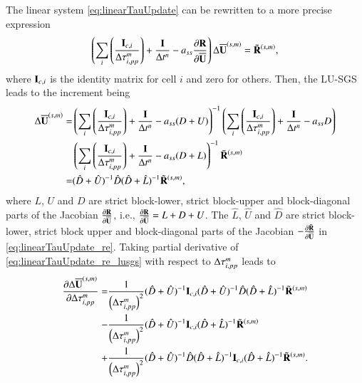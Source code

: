 The linear system \eqref{eq:linearTauUpdate} can be rewritten to a more precise expression
\begin{equation}
    \left(\sum_i\left(\frac{\eye_{c,i}}{\inc \tau^m_{i,pp}}\right) + \frac{\eye}{\inc t^n} -a_{ss}\partialderivative{\R }{\uu} \right) \inc \uu^{\left(s,m\right)}
    = \tilde{\R}^{\left(s,m\right)},
    \label{eq:linearTauUpdate_re}
\end{equation}
where $\mathbf{I}_{c,i}$ is 
the identity matrix for cell $i$ and zero for others.
Then, the LU-SGS leads to the increment being
\begin{equation}
    \begin{aligned}
        \mathrm\Delta \overline{\mathbf{U}}^{\left(s,m\right)}
     = &
    \left(\sum_i\left(\frac{\mathbf{I}_{c,i}}{\mathrm\Delta \tau^m_{i,pp}}\right) + \frac{\mathbf{I}}{\mathrm\Delta t^n} -a_{ss}(D+U) \right)^{-1}
    \left(\sum_i\left(\frac{\mathbf{I}_{c,i}}{\mathrm\Delta \tau^m_{i,pp}}\right) + \frac{\mathbf{I}}{\mathrm\Delta t^n} -a_{ss}D \right)\\
    &
    \left(\sum_i\left(\frac{\mathbf{I}_{c,i}}{\mathrm\Delta \tau^m_{i,pp}}\right) + \frac{\mathbf{I}}{\mathrm\Delta t^n} -a_{ss}(D+L) \right)^{-1}
    \tilde{\mathbf{R}}^{\left(s,m\right)} \\
    = & (\hat{D}+\hat{U})^{-1}\hat{D}(\hat{D}+\hat{L})^{-1}
    \tilde{\mathbf{R}}^{\left(s,m\right)} , 
    \end{aligned}
    \label{eq:linearTauUpdate_re_lusgs}
\end{equation}
where $L$, $U$ and $D$ are strict block-lower, strict block-upper and block-diagonal 
parts of the Jacobian $\partialderivative{\R }{\uu}$, i.e., $\partialderivative{\R }{\uu} = L + D + U$.
The $\hat L$, $\hat U$ and $\hat D$ are strict block-lower, strict block upper and block-diagonal 
parts of the Jacobian $-\partialderivative{\tilde\R }{\uu}$ in \eqref{eq:linearTauUpdate_re}.
Taking partial derivative of \eqref{eq:linearTauUpdate_re_lusgs} with respect to $\mathrm\Delta\tau^m_{i,pp}$ leads to
\begin{equation}
    \begin{aligned}
       \pdv{\mathrm\Delta\overline{\mathbf{U}}^{\left(s,m\right)}}{\mathrm\Delta\tau^m_{i,pp}}
    = & \frac{1}{\left(\mathrm\Delta\tau^m_{i,pp}\right)^2}
    (\hat{D}+\hat{U})^{-1}\mathbf{I}_{c,i}(\hat{D}+\hat{U})^{-1}\hat{D}(\hat{D}+\hat{L})^{-1}
    \tilde{\mathbf{R}}^{\left(s,m\right)} \\
    - & \frac{1}{\left(\mathrm\Delta\tau^m_{i,pp}\right)^2}
    (\hat{D}+\hat{U})^{-1}\mathbf{I}_{c,i}(\hat{D}+\hat{L})^{-1}
    \tilde{\mathbf{R}}^{\left(s,m\right)} \\
    + & \frac{1}{\left(\mathrm\Delta\tau^m_{i,pp}\right)^2}
    (\hat{D}+\hat{U})^{-1}\hat{D}(\hat{D}+\hat{L})^{-1}\mathbf{I}_{c,i}(\hat{D}+\hat{L})^{-1}
    \tilde{\mathbf{R}}^{\left(s,m\right)}.
    \end{aligned}
    \label{eq:linearTauUpdate_re_lusgs_pdvtau}
\end{equation}
